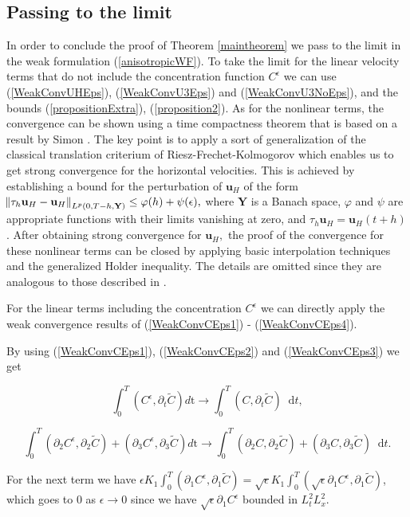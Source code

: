 \documentclass[11pt]{article}
\newcommand*\diff{\mathop{}\!\mathrm{d}}
\begin{document}
\subsection{Passing to the limit}

    In order to conclude the proof of Theorem \ref{maintheorem} we pass to the limit in the weak formulation (\ref{anisotropicWF}). To take the limit for the linear velocity terms that do not include the concentration function $C^\epsilon$ we can use (\ref{WeakConvUHEps}), (\ref{WeakConvU3Eps}) and (\ref{WeakConvU3NoEps}), and the bounds (\ref{propositionExtra}), (\ref{proposition2}). As for the nonlinear terms, the convergence can be shown using a time compactness theorem that is based on a result by Simon \cite{simon1986compact}. The key point is to apply a sort of generalization of the classical translation criterium of Riesz-Frechet-Kolmogorov which enables us to get strong convergence for the horizontal velocities. This is achieved by establishing a bound for the perturbation of $\mathbf{u}_H$ of the form $\norm{\tau_h \mathbf{u}_H - \mathbf{u}_H}_{L^p(0,T-h, \mathbf{Y})} \leq \varphi(h) + \psi(\epsilon),$ where $\mathbf{Y}$ is a Banach space, $\varphi$ and $\psi$ are appropriate functions with their limits vanishing at zero, and $\tau_h \mathbf{u}_H = \mathbf{u}_H (t+h) $. After obtaining strong convergence for $\mathbf{u}_H,$ the proof of the convergence for these nonlinear terms can be closed by applying basic interpolation techniques and the generalized Holder inequality. The details are omitted since they are analogous to those described in \cite{azerad2001mathematical}.
  
    For the linear terms including the concentration $C^\epsilon$ we can directly apply the weak convergence results of (\ref{WeakConvCEps1}) - (\ref{WeakConvCEps4}).
    
    By using (\ref{WeakConvCEps1}), (\ref{WeakConvCEps2}) and (\ref{WeakConvCEps3}) we get
    
    \[ \int_0 ^ T (C^\epsilon , \partial_t \tilde{C}) d \mathrm{t} \to \int_0^T (C, \partial_t \tilde{C}) \diff t,\]
    
    \[ \int_0 ^ T (\partial_2 C^\epsilon , \partial_2 \tilde{C}) + (\partial_3 C^\epsilon , \partial_3 \tilde{C}) d \mathrm{t} \to \int_0^T (\partial_2 C, \partial_2 \tilde{C}) + (\partial_3 C, \partial_3 \tilde{C}) \diff t.\]
      
    For the next term we have $\epsilon K_1 \int_0 ^T (\partial_1 C^\epsilon, \partial_1 \tilde{C}) = \sqrt{\epsilon} K_1 \int_0 ^T (\sqrt{\epsilon} \partial_1 C^\epsilon, \partial_1 \tilde{C})$, which goes to 0 as $\epsilon \to 0$ since we have $\sqrt{\epsilon} \partial_1 C^\epsilon$ bounded in $L^2_t L^2_x.$
      
\end{document}
